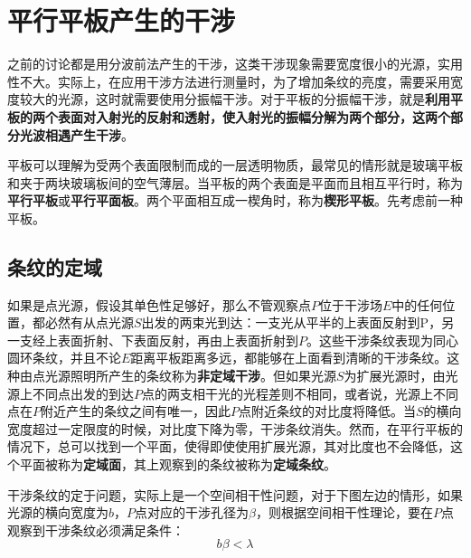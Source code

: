 \documentclass[UTF8]{ctexart}
\begin{document}
	\section{平行平板产生的干涉}
	之前的讨论都是用分波前法产生的干涉，这类干涉现象需要宽度很小的光源，实用性不大。实际上，在应用干涉方法进行测量时，为了增加条纹的亮度，需要采用宽度较大的光源，这时就需要使用分振幅干涉。对于平板的分振幅干涉，就是\textbf{利用平板的两个表面对入射光的反射和透射，使入射光的振幅分解为两个部分，这两个部分光波相遇产生干涉}。
	
	平板可以理解为受两个表面限制而成的一层透明物质，最常见的情形就是玻璃平板和夹于两块玻璃板间的空气薄层。当平板的两个表面是平面而且相互平行时，称为\textbf{平行平板}或\textbf{平行平面板}。两个平面相互成一楔角时，称为\textbf{楔形平板}。先考虑前一种平板。
	
	\subsection{条纹的定域}
	如果是点光源，假设其单色性足够好，那么不管观察点$ P $位于干涉场$ E $中的任何位置，都必然有从点光源$ S $出发的两束光到达：一支光从平半的上表面反射到P，另一支经上表面折射、下表面反射，再由上表面折射到$ P $。这些干涉条纹表现为同心圆环条纹，并且不论$ E $距离平板距离多远，都能够在上面看到清晰的干涉条纹。这种由点光源照明所产生的条纹称为\textbf{非定域干涉}。但如果光源$ S $为扩展光源时，由光源上不同点出发的到达$ P $点的两支相干光的光程差则不相同，或者说，光源上不同点在$ P $附近产生的条纹之间有唯一，因此$ P $点附近条纹的对比度将降低。当$ S $的横向宽度超过一定限度的时候，对比度下降为零，干涉条纹消失。然而，在平行平板的情况下，总可以找到一个平面，使得即使使用扩展光源，其对比度也不会降低，这个平面被称为\textbf{定域面}，其上观察到的条纹被称为\textbf{定域条纹}。
	
	干涉条纹的定于问题，实际上是一个空间相干性问题，对于下图左边的情形，如果光源的横向宽度为$ b $，$ P $点对应的干涉孔径为$ \beta $，则根据空间相干性理论，要在$ P $点观察到干涉条纹必须满足条件：
	\begin{equation}
		b \beta < \lambda
	\end{equation}
	
\end{document}
